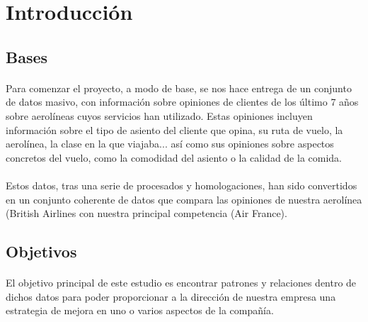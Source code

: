 \documentclass{report}
\begin{document}
        \section{Introducción}
            \subsection{Bases}
                \paragraph*{}{
                Para comenzar el proyecto, a modo de base, se nos hace entrega de un conjunto de datos masivo, con información sobre opiniones de clientes de los último 7 años sobre aerolíneas cuyos servicios han utilizado. Estas opiniones incluyen información sobre el tipo de asiento del cliente que opina, su ruta de vuelo, la aerolínea, la clase en la que viajaba... así como sus opiniones sobre aspectos concretos del vuelo, como la comodidad del asiento o la calidad de la comida. 
                }
                \paragraph*{}{Estos datos, tras una serie de procesados y homologaciones, han sido convertidos en un conjunto coherente de datos que compara las opiniones de nuestra aerolínea (British Airlines} con nuestra principal competencia (Air France).
            \subsection{Objetivos}
                \paragraph*{}{El objetivo principal de este estudio es encontrar patrones y relaciones dentro de dichos datos para poder proporcionar a la dirección de nuestra empresa una estrategia de mejora en uno o varios aspectos de la compañía.}
\end{document}
